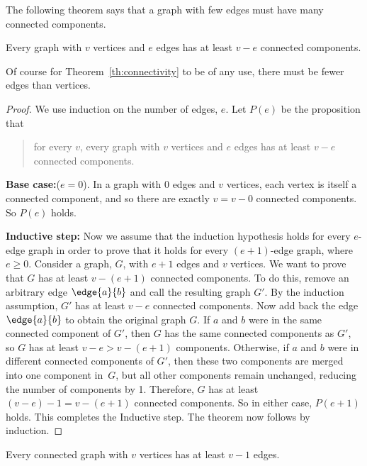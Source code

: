 The following theorem says that a graph with few edges must have many
connected components.
\begin{theorem}\label{th:connectivity}
Every graph with $v$ vertices and $e$ edges has at least $v - e$ connected
components.
\end{theorem}
Of course for Theorem~\ref{th:connectivity} to be of any use, there must
be fewer edges than vertices.

\begin{proof}
We use induction on the number of edges, $e$.  Let $P(e)$ be the
proposition that
\begin{quote}
for every $v$, every graph with $v$ vertices and $e$ edges has at least
$v-e$ connected components.
\end{quote}

\textbf{Base case:}($e=0$).  In a graph with 0 edges and $v$ vertices,
each vertex is itself a connected component, and so there are exactly $v =
v - 0$ connected components.  So $P(e)$ holds.

\textbf{Inductive step:} Now we assume that the induction hypothesis
holds for every $e$-edge graph in order to prove that it holds for
every $(e+1)$-edge graph, where $e \geq 0$.  Consider a graph, $G$,
with $e + 1$ edges and $v$ vertices.  We want to prove that $G$ has at
least $v - (e+1)$ connected components.  To do this, remove an
arbitrary edge $\edge{a}{b}$ and call the resulting graph $G'$.  By
the induction assumption, $G'$ has at least $v - e$ connected
components.  Now add back the edge $\edge{a}{b}$ to obtain the
original graph $G$.  If $a$ and $b$ were in the same connected
component of $G'$, then $G$ has the same connected components as $G'$,
so $G$ has at least $v -e > v - (e+1)$ components.  Otherwise, if $a$
and $b$ were in different connected components of $G'$, then these two
components are merged into one component in~$G$, but all other
components remain unchanged, reducing the number of components by 1.
Therefore, $G$ has at least $(v - e) - 1 = v - (e+1)$ connected
components.  So in either case, $P(e+1)$ holds.  This completes the
Inductive step.  The theorem now follows by induction.
\end{proof}

\begin{corollary}
\label{cor:n-1}
Every connected graph with $v$ vertices has at least $v - 1$ edges.
\end{corollary}

